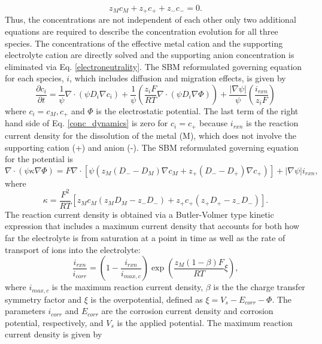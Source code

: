 \documentclass[10pt]{article}
\begin{document}
\begin{equation}
\label{electroneutrality}
z_M c_M + z_+ c_+ + z_-c_- = 0.
 \end{equation}
Thus, the concentrations are not independent of each other only two additional equations are required to describe the concentration evolution for all three species.  The concentrations of the effective metal cation and the supporting electrolyte cation are directly solved and the supporting anion concentration is eliminated via Eq. \eqref{electroneutrality}. The SBM reformulated governing equation for each species, $i$, which includes diffusion and migration effects, is given by
\begin{equation}
\label{conc_dynamics}
\frac{\partial c_i}{\partial t}=\frac{1}{\psi} \nabla \cdot (\psi D_i \nabla c_i) + \frac{1}{\psi} \left( \frac{z_i F}{RT} \nabla \cdot (\psi D_i \nabla \Phi) \right)
+ \frac{|\nabla \psi|}{\psi} \left( \frac{i_{rxn}}{z_i F} \right)
\end{equation}
\noindent where $c_i =c_M, c_+$ and $\Phi$ is the electrostatic potential.  The last term of the right hand side of Eq. \eqref{conc_dynamics} is zero for $c_i =c_+$  because $i_{rxn}$ is the reaction current density for the dissolution of the metal (M), which does not involve the supporting cation (+) and anion (-). The SBM reformulated governing equation for the potential is
\begin{equation}
\nabla \cdot (\psi \kappa \nabla \Phi) = F \nabla \cdot \left[ \psi \left( z_M (D_- - D_M) \nabla c_M + z_+ (D_- - D_+)  \nabla c_+ \right) \right] + |\nabla \psi | i_{rxn},
\end{equation}
where 
\begin{equation}
\kappa =\frac{F^2}{RT}\left[ z_Mc_M\left( z_MD_M-z_-D_-\right) + z_+c_+\left( z_+D_+-z_-D_-\right) \right].
\end{equation}
The reaction current density is obtained via a Butler-Volmer type kinetic expression that includes a maximum current density that accounts for both how far the electrolyte is from saturation at a point in time as well as the rate of transport of ions into the electrolyte:
\begin{equation}
\frac{i_{rxn}}{i_{corr}}= \left( 1 - \frac{i_{rxn}}{i_{max,c}} \right) \exp \left( \frac{z_M (1-\beta) F}{RT}\xi \right),
\end{equation}
where $i_{max,c}$ is the maximum reaction current density, $\beta$ is the the charge transfer symmetry factor and $\xi$ is the overpotential, defined as $\xi=V_s-E_{corr}-\Phi$. The parameters $i_{corr}$ and $E_{corr}$ are the corrosion current density and corrosion potential, respectively, and $V_s$ is the applied potential. The maximum reaction current density is given by
\end{document}
